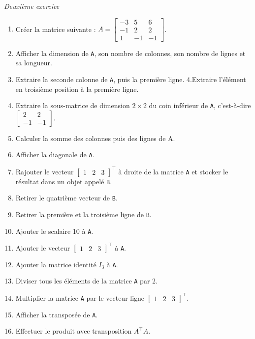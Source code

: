 \documentclass[12pt,]{book}
\providecommand{\tightlist}{%
  \setlength{\itemsep}{0pt}\setlength{\parskip}{0pt}}
\numberwithin{equation}{section}
\numberwithin{countremarque}{section}
\begin{document}
\emph{Deuxième exercice}

\begin{enumerate}
\def\labelenumi{\arabic{enumi}.}
\tightlist
\item
  Créer la matrice suivante :
  \(A = \begin{bmatrix} -3 & 5 & 6 \\ -1 & 2 & 2 \\ 1 & -1 & -1 \end{bmatrix}\).
\item
  Afficher la dimension de \texttt{A}, son nombre de colonnes, son
  nombre de lignes et sa longueur.
\item
  Extraire la seconde colonne de \texttt{A}, puis la première ligne.
  4.Extraire l'élément en troisième position à la première ligne.
\item
  Extraire la sous-matrice de dimension \(2\times 2\) du coin inférieur
  de \texttt{A}, c'est-à-dire
  \(\begin{bmatrix} 2 & 2 \\ -1 & -1 \end{bmatrix}\).
\item
  Calculer la somme des colonnes puis des lignes de A.
\item
  Afficher la diagonale de \texttt{A}.
\item
  Rajouter le vecteur \(\begin{bmatrix} 1 & 2 & 3\end{bmatrix}^\top\) à
  droite de la matrice \texttt{A} et stocker le résultat dans un objet
  appelé \texttt{B}.
\item
  Retirer le quatrième vecteur de \texttt{B}.
\item
  Retirer la première et la troisième ligne de \texttt{B}.
\item
  Ajouter le scalaire 10 à \texttt{A}.
\item
  Ajouter le vecteur \(\begin{bmatrix} 1 & 2 & 3\end{bmatrix}^\top\) à
  \texttt{A}.
\item
  Ajouter la matrice identité \(I_3\) à \texttt{A}.
\item
  Diviser tous les éléments de la matrice \texttt{A} par 2.
\item
  Multiplier la matrice \texttt{A} par le vecteur ligne
  \(\begin{bmatrix} 1 & 2 & 3\end{bmatrix}^\top\).
\item
  Afficher la transposée de \texttt{A}.
\item
  Effectuer le produit avec transposition \(A^\top A\).
\end{enumerate}
\end{document}
